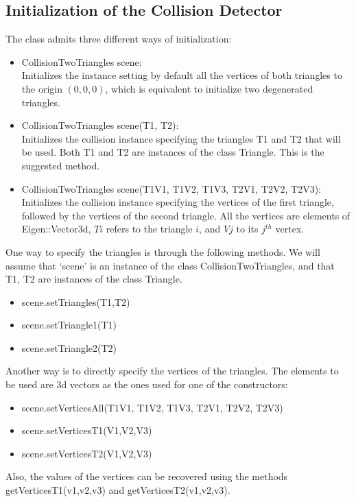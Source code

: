 \documentclass[11pt,a4paper]{article}
\begin{document}
\subsection{Initialization of the Collision Detector}

The class admits three different ways of initialization:
\begin{itemize}
  \item CollisionTwoTriangles scene: \\Initializes the instance setting by default all the vertices of both triangles to the origin $(0,0,0)$, which is equivalent to initialize two degenerated triangles.
  \item CollisionTwoTriangles scene(T1, T2):\\Initializes the collision instance specifying the triangles T1 and T2 that will be used. Both T1 and T2 are instances of the class Triangle. This is the suggested method.
  \item CollisionTwoTriangles scene(T1V1, T1V2, T1V3, T2V1, T2V2, T2V3):\\Initializes the collision instance specifying the vertices of the first triangle, followed by the vertices of the second triangle. All the vertices are elements of Eigen::Vector3d, $Ti$ refers to the triangle $i$, and $Vj$ to its $j^{th}$ vertex.
\end{itemize}
One way to specify the triangles is through the following methods. We will assume that `scene' is an instance of the class CollisionTwoTriangles, and that T1, T2 are instances of the class Triangle.
\begin{itemize}
  \item scene.setTriangles(T1,T2)
  \item scene.setTriangle1(T1)
  \item scene.setTriangle2(T2)
\end{itemize}
Another way is to directly specify the vertices of the triangles. The elements to be used are 3d vectors as the ones used for one of the constructors:
\begin{itemize}
  \item scene.setVerticesAll(T1V1, T1V2, T1V3, T2V1, T2V2, T2V3)
  \item scene.setVerticesT1(V1,V2,V3)
  \item scene.setVerticesT2(V1,V2,V3)
\end{itemize}
Also, the values of the vertices can be recovered using the methods getVerticesT1(v1,v2,v3) and getVerticesT2(v1,v2,v3).
\end{document}
